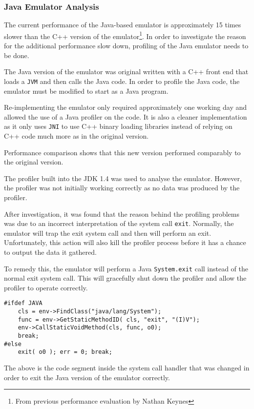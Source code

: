 \subsubsection{Java Emulator Analysis}

The current performance of the Java-based emulator is approximately 15
times slower than the C++ version of the emulator\footnote{From previous
performance evaluation by Nathan Keynes}. In order to investigate the
reason for the additional performance slow down, profiling of the Java
emulator needs to be done.

The Java version of the emulator was original written with a C++ front end
that loads a \verb!JVM! and then calls the Java code. In order to profile
the Java code, the emulator must be modified to start as a Java program.

Re-implementing the emulator only required approximately one working day
and allowed the use of a Java profiler on the code. It is also a cleaner
implementation as it only uses \verb!JNI! to use C++ binary loading
libraries instead of relying on C++ code much more as in the original
version.

Performance comparison shows that this new version performed comparably to
the original version.

The profiler built into the JDK 1.4 was used to analyse the emulator.
However, the profiler was not initially working correctly as no data was
produced by the profiler.

After investigation, it was found that the reason behind the profiling
problems was due to an incorrect interpretation of the system call
\verb!exit!. Normally, the emulator will trap the exit system call and
then will perform an exit. Unfortunately, this action will also kill the
profiler process before it has a chance to output the data it gathered.

To remedy this, the emulator will perform a Java \verb!System.exit! call
instead of the normal exit system call. This will gracefully shut down the
profiler and allow the profiler to operate correctly.

\begin{verbatim}
#ifdef JAVA
    cls = env->FindClass("java/lang/System");
    func = env->GetStaticMethodID( cls, "exit", "(I)V");
    env->CallStaticVoidMethod(cls, func, o0);
    break;
#else
    exit( o0 ); err = 0; break;
\end{verbatim}

The above is the code segment inside the system call handler that was
changed in order to exit the Java version of the emulator correctly.


